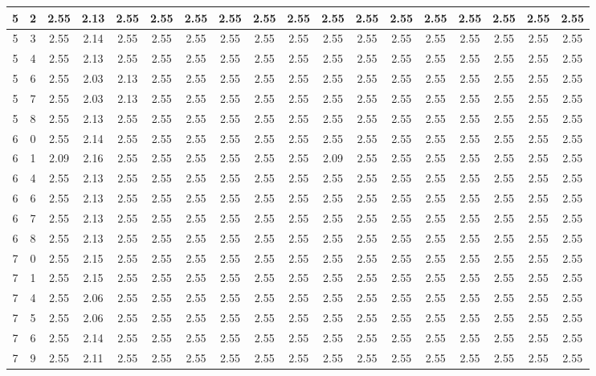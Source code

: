 \begin{landscape}
\begin{longtable}{|c|c||c||c|c|c|c|c|c|c||c|c|c|c|c|c|c|c|}
	5 & 2 & 2.55 & 2.13 & 2.55 & 2.55 & 2.55 & 2.55 & 2.55 & 2.55 & 2.55 & 2.55 & 2.55 & 2.55 & 2.55 & 2.55 & 2.55 & 2.55 \\ \hline
	5 & 3 & 2.55 & 2.14 & 2.55 & 2.55 & 2.55 & 2.55 & 2.55 & 2.55 & 2.55 & 2.55 & 2.55 & 2.55 & 2.55 & 2.55 & 2.55 & 2.55 \\ \hline
	5 & 4 & 2.55 & 2.13 & 2.55 & 2.55 & 2.55 & 2.55 & 2.55 & 2.55 & 2.55 & 2.55 & 2.55 & 2.55 & 2.55 & 2.55 & 2.55 & 2.55 \\ \hline
	5 & 6 & 2.55 & 2.03 & 2.13 & 2.55 & 2.55 & 2.55 & 2.55 & 2.55 & 2.55 & 2.55 & 2.55 & 2.55 & 2.55 & 2.55 & 2.55 & 2.55 \\ \hline
	5 & 7 & 2.55 & 2.03 & 2.13 & 2.55 & 2.55 & 2.55 & 2.55 & 2.55 & 2.55 & 2.55 & 2.55 & 2.55 & 2.55 & 2.55 & 2.55 & 2.55 \\ \hline
	5 & 8 & 2.55 & 2.13 & 2.55 & 2.55 & 2.55 & 2.55 & 2.55 & 2.55 & 2.55 & 2.55 & 2.55 & 2.55 & 2.55 & 2.55 & 2.55 & 2.55 \\ \hline
	6 & 0 & 2.55 & 2.14 & 2.55 & 2.55 & 2.55 & 2.55 & 2.55 & 2.55 & 2.55 & 2.55 & 2.55 & 2.55 & 2.55 & 2.55 & 2.55 & 2.55 \\ \hline
	6 & 1 & 2.09 & 2.16 & 2.55 & 2.55 & 2.55 & 2.55 & 2.55 & 2.55 & 2.09 & 2.55 & 2.55 & 2.55 & 2.55 & 2.55 & 2.55 & 2.55 \\ \hline
	6 & 4 & 2.55 & 2.13 & 2.55 & 2.55 & 2.55 & 2.55 & 2.55 & 2.55 & 2.55 & 2.55 & 2.55 & 2.55 & 2.55 & 2.55 & 2.55 & 2.55 \\ \hline
	6 & 6 & 2.55 & 2.13 & 2.55 & 2.55 & 2.55 & 2.55 & 2.55 & 2.55 & 2.55 & 2.55 & 2.55 & 2.55 & 2.55 & 2.55 & 2.55 & 2.55 \\ \hline
	6 & 7 & 2.55 & 2.13 & 2.55 & 2.55 & 2.55 & 2.55 & 2.55 & 2.55 & 2.55 & 2.55 & 2.55 & 2.55 & 2.55 & 2.55 & 2.55 & 2.55 \\ \hline
	6 & 8 & 2.55 & 2.13 & 2.55 & 2.55 & 2.55 & 2.55 & 2.55 & 2.55 & 2.55 & 2.55 & 2.55 & 2.55 & 2.55 & 2.55 & 2.55 & 2.55 \\ \hline
	7 & 0 & 2.55 & 2.15 & 2.55 & 2.55 & 2.55 & 2.55 & 2.55 & 2.55 & 2.55 & 2.55 & 2.55 & 2.55 & 2.55 & 2.55 & 2.55 & 2.55 \\ \hline
	7 & 1 & 2.55 & 2.15 & 2.55 & 2.55 & 2.55 & 2.55 & 2.55 & 2.55 & 2.55 & 2.55 & 2.55 & 2.55 & 2.55 & 2.55 & 2.55 & 2.55 \\ \hline
	7 & 4 & 2.55 & 2.06 & 2.55 & 2.55 & 2.55 & 2.55 & 2.55 & 2.55 & 2.55 & 2.55 & 2.55 & 2.55 & 2.55 & 2.55 & 2.55 & 2.55 \\ \hline
	7 & 5 & 2.55 & 2.06 & 2.55 & 2.55 & 2.55 & 2.55 & 2.55 & 2.55 & 2.55 & 2.55 & 2.55 & 2.55 & 2.55 & 2.55 & 2.55 & 2.55 \\ \hline
	7 & 6 & 2.55 & 2.14 & 2.55 & 2.55 & 2.55 & 2.55 & 2.55 & 2.55 & 2.55 & 2.55 & 2.55 & 2.55 & 2.55 & 2.55 & 2.55 & 2.55 \\ \hline
	7 & 9 & 2.55 & 2.11 & 2.55 & 2.55 & 2.55 & 2.55 & 2.55 & 2.55 & 2.55 & 2.55 & 2.55 & 2.55 & 2.55 & 2.55 & 2.55 & 2.55 \\ \hline
\end{longtable}

\end{landscape}\clearpage{}
